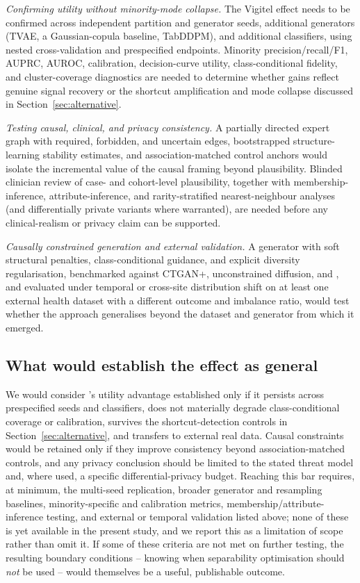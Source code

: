\emph{Confirming utility without minority-mode collapse.} The Vigitel effect needs to be confirmed across independent partition and generator seeds, additional generators (TVAE, a Gaussian-copula baseline, TabDDPM), and additional classifiers, using nested cross-validation and prespecified endpoints. Minority precision/recall/F1, AUPRC, AUROC, calibration, decision-curve utility, class-conditional fidelity, and cluster-coverage diagnostics are needed to determine whether gains reflect genuine signal recovery or the shortcut amplification and mode collapse discussed in Section~\ref{sec:alternative}.

\emph{Testing causal, clinical, and privacy consistency.} A partially directed expert graph with required, forbidden, and uncertain edges, bootstrapped structure-learning stability estimates, and association-matched control anchors would isolate the incremental value of the causal framing beyond plausibility. Blinded clinician review of case- and cohort-level plausibility, together with membership-inference, attribute-inference, and rarity-stratified nearest-neighbour analyses (and differentially private variants where warranted), are needed before any clinical-realism or privacy claim can be supported.

\emph{Causally constrained generation and external validation.} A generator with soft structural penalties, class-conditional guidance, and explicit diversity regularisation, benchmarked against CTGAN+\sepa{}, unconstrained diffusion, and \dacpf{}, and evaluated under temporal or cross-site distribution shift on at least one external health dataset with a different outcome and imbalance ratio, would test whether the approach generalises beyond the dataset and generator from which it emerged.

\subsection{What would establish the effect as general}
\label{sec:decision-criteria}

We would consider \sepa{}'s utility advantage established only if it persists across prespecified seeds and classifiers, does not materially degrade class-conditional coverage or calibration, survives the shortcut-detection controls in Section~\ref{sec:alternative}, and transfers to external real data. Causal constraints would be retained only if they improve consistency beyond association-matched controls, and any privacy conclusion should be limited to the stated threat model and, where used, a specific differential-privacy budget. Reaching this bar requires, at minimum, the multi-seed replication, broader generator and resampling baselines, minority-specific and calibration metrics, membership/attribute-inference testing, and external or temporal validation listed above; none of these is yet available in the present study, and we report this as a limitation of scope rather than omit it. If some of these criteria are not met on further testing, the resulting boundary conditions -- knowing when separability optimisation should \emph{not} be used -- would themselves be a useful, publishable outcome.
